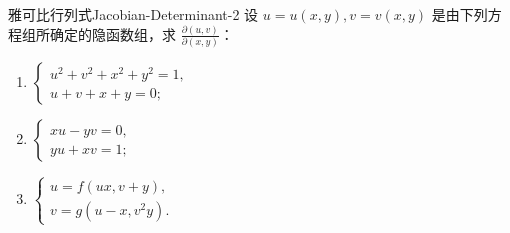 \begin{problem}{雅可比行列式}{Jacobian-Determinant-2}
    设 $u = u(x,y), v = v(x,y)$ 是由下列方程组所确定的隐函数组，求 $\frac{\partial(u,v)}{\partial(x,y)}$：
    \begin{enumerate}
        \item $\begin{cases} u^2 + v^2 + x^2 + y^2 = 1, \\ u + v + x + y = 0; \end{cases}$
        \item $\begin{cases} xu - yv = 0, \\ yu + xv = 1; \end{cases}$
        \item $\begin{cases} u = f(ux, v + y), \\ v = g(u - x, v^2y). \end{cases}$
    \end{enumerate}
\end{problem}

